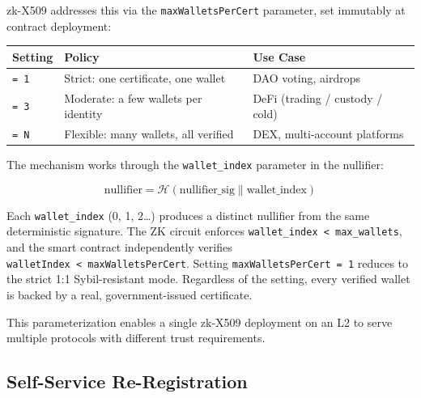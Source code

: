 \documentclass[11pt, a4paper]{article}
\begin{document}
zk-X509 addresses this via the \texttt{maxWalletsPerCert} parameter, set
immutably at contract deployment:

\begin{longtable}[]{@{}
  >{\raggedright\arraybackslash}p{}
  >{\raggedright\arraybackslash}p{}
  >{\raggedright\arraybackslash}p{}@{}}
\toprule\noalign{}
\begin{minipage}[b]{\linewidth}\raggedright
Setting
\end{minipage} & \begin{minipage}[b]{\linewidth}\raggedright
Policy
\end{minipage} & \begin{minipage}[b]{\linewidth}\raggedright
Use Case
\end{minipage} \\
\midrule\noalign{}
\endhead
\bottomrule\noalign{}
\endlastfoot
\texttt{=\ 1} & Strict: one certificate, one wallet & DAO voting,
airdrops \\
\texttt{=\ 3} & Moderate: a few wallets per identity & DeFi (trading /
custody / cold) \\
\texttt{=\ N} & Flexible: many wallets, all verified & DEX,
multi-account platforms \\
\end{longtable}

The mechanism works through the \texttt{wallet\_index} parameter in the
nullifier:

\[\text{nullifier} = \mathcal{H}(\text{nullifier\_sig} \| \text{wallet\_index})\]

Each \texttt{wallet\_index} (0, 1, 2\ldots) produces a distinct
nullifier from the same deterministic signature. The ZK circuit enforces
\texttt{wallet\_index\ \textless{}\ max\_wallets}, and the smart
contract independently verifies
\texttt{walletIndex\ \textless{}\ maxWalletsPerCert}. Setting
\texttt{maxWalletsPerCert\ =\ 1} reduces to the strict 1:1
Sybil-resistant mode. Regardless of the setting, every verified wallet
is backed by a real, government-issued certificate.

This parameterization enables a single zk-X509 deployment on an L2 to
serve multiple protocols with different trust requirements.

\subsection{Self-Service
Re-Registration}\label{self-service-re-registration}
\end{document}
